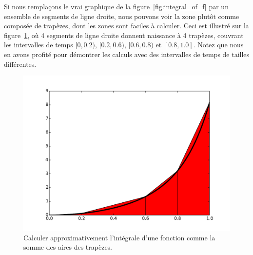 \documentclass[%
oneside,                 %
final,                   %
10pt]{article}
\begin{document}
Si nous remplaçons le vrai graphique de la figure~\ref{fig:integral_of_f} par un ensemble de segments de ligne droite, nous pouvons voir la zone plutôt comme composée de trapèzes, dont les zones sont faciles à calculer. Ceci est illustré sur la figure~\ref{fig:viz_trapezoidal}, où 4 segments de ligne droite donnent naissance à 4 trapèzes, couvrant les intervalles de temps $[0,0.2)$, $[0.2,0.6)$, $[0.6,0.8)$ et $[0.8,1.0]$. Notez que nous en avons profité pour démontrer les calculs avec des intervalles de temps de tailles différentes.

\begin{figure}[!ht]  %
  \centerline{\includegraphics[width=0.7\linewidth]{imgs/viz_trapezoidal.pdf}}
  \caption{
  Calculer approximativement l'intégrale d'une fonction comme la somme des aires des trapèzes. \label{fig:viz_trapezoidal}
  }
\end{figure}
\end{document}
